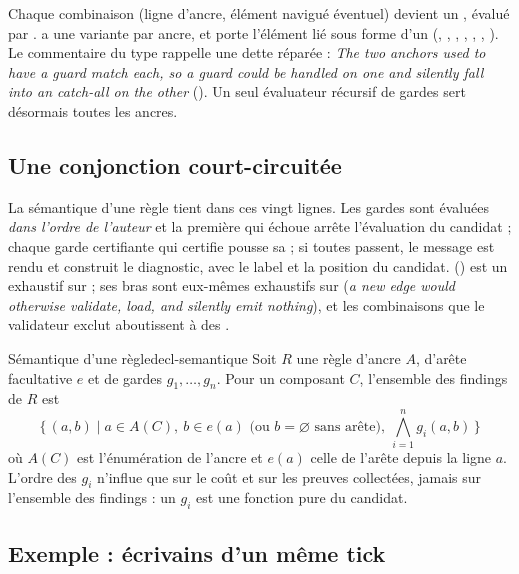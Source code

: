 Chaque combinaison (ligne d'ancre, élément navigué éventuel) devient un , évalué par .  a une variante par ancre, et  porte l'élément lié sous forme d'un  (, , , , , , ). Le commentaire du type rappelle une dette réparée : \og \emph{The two anchors used to have a guard match each, so a guard could be handled on one and silently fall into an  catch-all on the other}\fg{} (). Un seul évaluateur récursif de gardes sert désormais toutes les ancres.

\subsection{Une conjonction court-circuitée}


La sémantique d'une règle tient dans ces vingt lignes. Les gardes sont évaluées \emph{dans l'ordre de l'auteur} et la première qui échoue arrête l'évaluation du candidat ; chaque garde certifiante qui certifie pousse sa  ; si toutes passent, le message est rendu et  construit le diagnostic, avec le label et la position du candidat.  () est un  exhaustif sur  ; ses bras sont eux-mêmes exhaustifs sur  (\og \emph{a new edge would otherwise validate, load, and silently emit nothing}\fg{}), et les combinaisons que le validateur exclut aboutissent à des .

\begin{proposition}{Sémantique d'une règle}{decl-semantique}
Soit $R$ une règle d'ancre $A$, d'arête facultative $e$ et de gardes $g_1, \ldots, g_n$. Pour un composant $C$, l'ensemble des findings de $R$ est
\[
  \{\, (a, b) \mid a \in A(C),\ b \in e(a) \text{ (ou } b = \varnothing \text{ sans arête)},\ \textstyle\bigwedge_{i=1}^{n} g_i(a, b) \,\}
\]
où $A(C)$ est l'énumération de l'ancre et $e(a)$ celle de l'arête depuis la ligne $a$. L'ordre des $g_i$ n'influe que sur le coût et sur les preuves collectées, jamais sur l'ensemble des findings : un $g_i$ est une fonction pure du candidat.
\end{proposition}

\subsection{Exemple : écrivains d'un même tick}

